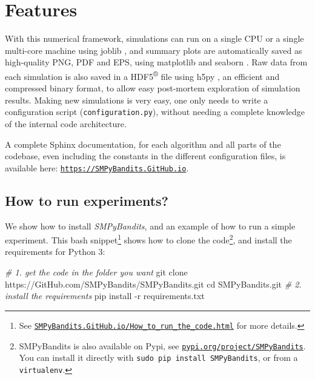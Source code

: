 \documentclass[a4paper,10pt,]{article}
\newenvironment{Shaded}{}{}
\newcommand{\BuiltInTok}[1]{#1}
\newcommand{\CommentTok}[1]{\textcolor[rgb]{0.38,0.63,0.69}{\textit{#1}}}
\newcommand{\ExtensionTok}[1]{#1}
\newcommand{\FunctionTok}[1]{\textcolor[rgb]{0.02,0.16,0.49}{#1}}
\newcommand{\NormalTok}[1]{#1}
\begin{document}
\section{Features}\label{features}

With this numerical framework, simulations can run on a single CPU or a
single multi-core machine using joblib \citep{joblib}, and summary plots are
automatically saved as high-quality PNG, PDF and EPS, using matplotlib \citep{matplotlib} and seaborn \citep{seaborn}.
Raw data from each simulation is also saved in a HDF5\textsuperscript{®} file using h5py \citep{h5py}, an efficient and compressed binary format, to allow easy post-mortem exploration of simulation results.
Making new simulations is very easy, one only
needs to write a configuration script (\texttt{configuration.py}), without needing a complete knowledge of the internal code architecture.

A complete Sphinx documentation, for each algorithm and all parts of the codebase, even including the constants in the different configuration files, is available here:
\href{SMPyBandits.GitHub.io/}{\texttt{https://SMPyBandits.GitHub.io}}.

\subsection{How to run experiments?}\label{how-to-run-the-experiments}

We show how to install \emph{SMPyBandits}, and an example of how to run
a simple experiment. This bash snippet\footnote{See
\href{https://SMPyBandits.GitHub.io/How_to_run_the_code.html}{\texttt{SMPyBandits.GitHub.io/How\_to\_run\_the\_code.html}}
for more details.} shows how to clone the code\footnote{SMPyBandits is also available on Pypi, see
\href{https://pypi.org/project/SMPyBandits/}{\texttt{pypi.org/project/SMPyBandits}}.
You can install it directly with
\texttt{sudo\ pip\ install\ SMPyBandits}, or from a
\texttt{virtualenv}.}, and install the requirements for Python 3:

\begin{Shaded}
\begin{Highlighting}[]
\CommentTok{# 1. get the code in the folder you want}
\NormalTok{\textdollar }\FunctionTok{git}\NormalTok{ clone https://GitHub.com/SMPyBandits/SMPyBandits.git}
\NormalTok{\textdollar }\BuiltInTok{cd}\NormalTok{ SMPyBandits.git}
\CommentTok{# 2. install the requirements}
\NormalTok{\textdollar }\ExtensionTok{pip}\NormalTok{ install -r requirements.txt}
\end{Highlighting}
\end{Shaded}
\end{document}
